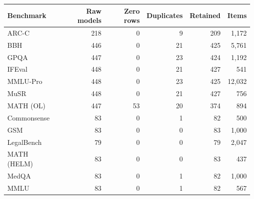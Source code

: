 \begin{tabular}{lrrrrr}
\toprule
Benchmark & Raw models & Zero rows & Duplicates & Retained & Items \\
\midrule
ARC-C & 218 & 0 & 9 & 209 & 1,172 \\
BBH & 446 & 0 & 21 & 425 & 5,761 \\
GPQA & 447 & 0 & 23 & 424 & 1,192 \\
IFEval & 448 & 0 & 21 & 427 & 541 \\
MMLU-Pro & 448 & 0 & 23 & 425 & 12,032 \\
MuSR & 448 & 0 & 21 & 427 & 756 \\
MATH (OL) & 447 & 53 & 20 & 374 & 894 \\
Commonsense & 83 & 0 & 1 & 82 & 500 \\
GSM & 83 & 0 & 0 & 83 & 1,000 \\
LegalBench & 79 & 0 & 0 & 79 & 2,047 \\
MATH (HELM) & 83 & 0 & 0 & 83 & 437 \\
MedQA & 83 & 0 & 1 & 82 & 1,000 \\
MMLU & 83 & 0 & 1 & 82 & 567 \\
\bottomrule
\end{tabular}